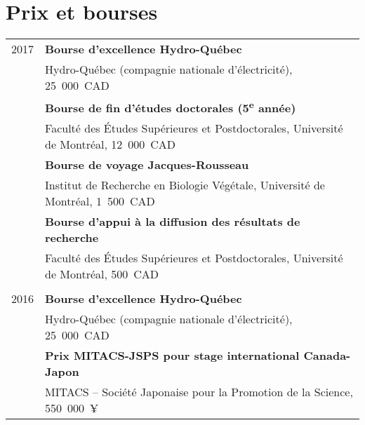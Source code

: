 \documentclass[letterpaper,10pt]{article}
\begin{document}
{\begin{tabular}{r|p{14.1cm}}
\end{tabular}




\section{Prix et bourses}
\begin{tabular}{r|p{14cm}}


2017

& \textbf{Bourse d'excellence Hydro-Québec} \\
& Hydro-Québec (compagnie nationale d'électricité), 25~000~CAD \vspace{1.3mm} \\

& \textbf{Bourse de fin d'études doctorales (5\textsuperscript{e} année)} \\
& Faculté des Études Supérieures et Postdoctorales, Université de Montréal, 12~000~CAD \\

& \textbf{Bourse de voyage Jacques-Rousseau} \\
& Institut de Recherche en Biologie Végétale, Université de Montréal, 1~500~CAD \vspace{1.3mm} \\

& \textbf{Bourse d'appui à la diffusion des résultats de recherche} \\
& Faculté des Études Supérieures et Postdoctorales, Université de Montréal, 500~CAD \\


\multicolumn{2}{c}{} \\

2016

& \textbf{Bourse d'excellence Hydro-Québec} \\
& Hydro-Québec (compagnie nationale d'électricité), 25~000~CAD \vspace{1.3mm} \\

& \textbf{Prix MITACS-JSPS pour stage international Canada-Japon} \\
& MITACS -- Société Japonaise pour la Promotion de la Science, 550~000~¥ \vspace{1.3mm} \\


\end{tabular}}
\end{document}
